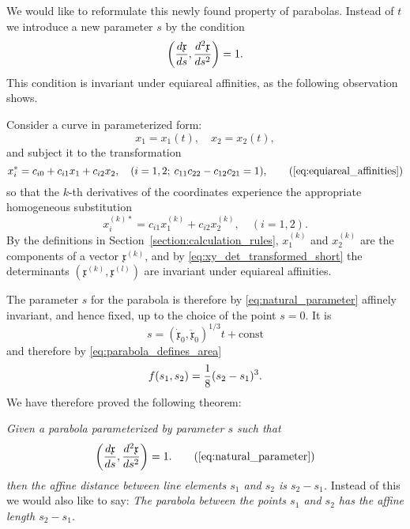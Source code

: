 \documentclass[11pt]{book} \usepackage{amssymb}
\newcommand{\myvec}[1]{\mathfrak{#1}}
\newcommand{\vecx}{\myvec{x}}
\newcommand{\vecderiv}[1]{\dot{\myvec{#1}}}
\newcommand{\vecderivv}[1]{\ddot{\myvec{#1}}}
\begin{document}
We would like to reformulate this newly found property of parabolas. Instead of
$t$ we introduce a new parameter $s$ by the condition
\begin{equation}
  \label{eq:natural_parameter}
  \left({d\vecx\over ds},{d^2\vecx\over ds^2}\right)=1.
\end{equation}
This condition is invariant under equiareal affinities, as the following 
observation shows.

Consider a curve in parameterized form:
\begin{equation}
  \label{eq:parameterized_curve}
  x_1=x_1(t),\quad x_2=x_2(t),
\end{equation}
and subject it to the transformation 
\begin{equation*}
  x_i^*=c_{i0}+c_{i1}x_1+c_{i2}x_2,\quad (i=1,2;\: c_{11}c_{22}-c_{12}c_{21}=1),
  \tag{\ref{eq:equiareal_affinities}}
\end{equation*}
so that the $k$-th derivatives of the coordinates experience the appropriate
homogeneous substitution
\begin{equation}
  \label{eq:deriv_transform}
  x_i^{(k)*}=c_{i1}x_1^{(k)}+c_{i2}x_2^{(k)}, \quad (i=1,2).
\end{equation}
By the definitions in Section~\ref{section:calculation_rules}, $x_1^{(k)}$ and
$x_2^{(k)}$ are the components of a vector $\vecx^{(k)}$, and by 
\eqref{eq:xy_det_transformed_short} the determinants 
$(\vecx^{(k)},\vecx^{(l)})$ are invariant under equiareal affinities.

The parameter $s$ for the parabola is therefore by \eqref{eq:natural_parameter}
affinely invariant, and hence fixed, up to the choice of the point $s=0$. It
is
\begin{equation*}
  s=(\vecderiv{x}_0,\vecderivv{x}_0)^{1/3}t+\mbox{const}
\end{equation*}
and therefore by \eqref{eq:parabola_defines_area}
\begin{equation}
  \label{eq:area_by_natural_param}
  f(s_1,s_2)={1\over 8}(s_2-s_1)^3.
\end{equation}
We have therefore proved the following theorem:

{\em Given a parabola parameterized by parameter $s$ such that
  \begin{equation}
    \left({d\vecx\over ds},{d^2\vecx\over ds^2}\right)=1.
    \tag{\ref{eq:natural_parameter}}
  \end{equation}
  then the affine distance between line elements $s_1$ and $s_2$ is $s_2-s_1$.}
Instead of this we would also like to say: {\em The parabola between the points
$s_1$ and $s_2$ has the affine length $s_2-s_1$.}
\end{document}
